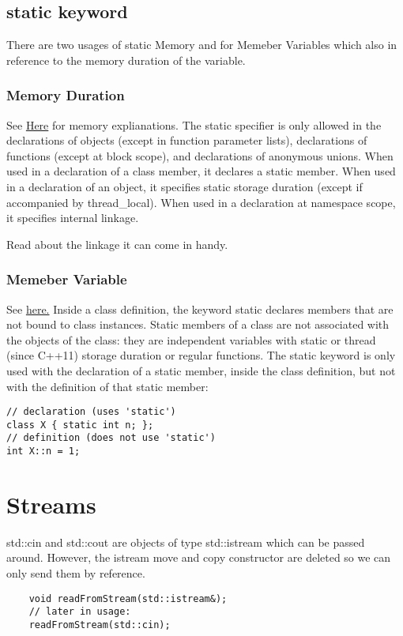 \documentclass[11pt,twoside,a4paper]{report}
\begin{document}
\section{static keyword}
There are two usages of static Memory and for Memeber Variables which also in reference to the memory duration of the variable.
\subsection{Memory Duration}
See \href{https://en.cppreference.com/w/cpp/language/storage_duration}{Here} for memory explianations.
The static specifier is only allowed in the declarations of objects (except in function parameter lists), declarations of functions (except at block scope), 
and declarations of anonymous unions. When used in a declaration of a class member, it declares a static member.
When used in a declaration of an object, it specifies static storage duration (except if accompanied by thread\_local).
When used in a declaration at namespace scope, it specifies internal linkage.

Read about the linkage it can come in handy.
\subsection{Memeber Variable}
See \href{https://en.cppreference.com/w/cpp/language/static}{here.}
Inside a class definition, the keyword static declares members that are not bound to class instances.
Static members of a class are not associated with the objects of the class: they are independent variables
with static or thread (since C++11) storage duration or regular functions. The static keyword is only used 
with the declaration of a static member, inside the class definition, but not with the definition of that static member: 

\begin{lstlisting}
// declaration (uses 'static')
class X { static int n; };
// definition (does not use 'static')
int X::n = 1;              
\end{lstlisting}



\chapter{Streams}
std::cin and std::cout are objects of type std::istream which can be passed around. However, the istream move and copy constructor are deleted so we can only send them by reference.

\begin{lstlisting}
    void readFromStream(std::istream&);
    // later in usage:
    readFromStream(std::cin);
\end{lstlisting}
\end{document}

